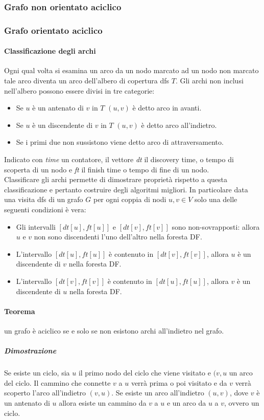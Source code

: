 \subsubsection{Grafo non orientato aciclico}



\subsubsection{Grafo orientato aciclico}
\paragraph{Classificazione degli archi}
Ogni qual volta si esamina un arco da un nodo marcato ad un nodo non marcato tale arco diventa un arco dell'albero di copertura dfs $T$. Gli archi non 
inclusi nell'albero possono essere divisi in tre categorie:
\begin{itemize}
\item Se $u$ \`e un antenato di $v$ in $T$ $(u, v)$ \`e detto arco in avanti.
\item Se $u$ \`e un discendente di $v$ in $T$ $(u, v)$ \`e detto arco all'indietro.
\item Se i primi due non sussistono viene detto arco di attraversamento. 
\end{itemize}
Indicato con \emph{time} un contatore, il vettore \emph{dt} il discovery time, o tempo di scoperta di un nodo e \emph{ft} il finish time o tempo di fine di un 
nodo.\\

Classificare gli archi permette di dimostrare propriet\`a rispetto a questa classificazione e pertanto costruire degli algoritmi migliori. In particolare 
data una visita dfs di un grafo $G$ per ogni coppia di nodi $u, v\in V$ solo una delle seguenti condizioni \`e vera:
\begin{itemize}
\item Gli intervalli $[dt[u], ft[u]]$ e $[dt[v], ft[v]]$ sono non-sovrapposti: allora $u$ e $v$ non sono discendenti l'uno dell'altro nella foresta DF.
\item L'intervallo $[dt[u], ft[u]]$ \`e contenuto in $[dt[v], ft[v]]$, allora $u$ \`e un discendente di $v$ nella foresta DF.
\item L'intervallo $[dt[v], ft[v]]$ \`e contenuto in $[dt[u], ft[u]]$, allora $v$ \`e un discendente di $u$ nella foresta DF.
\end{itemize}
\paragraph{Teorema}
un grafo \`e aciclico se e solo se non esistono archi all'indietro nel grafo.
\subparagraph{Dimostrazione}
Se esiste un ciclo, sia $u$ il primo nodo del ciclo che viene visitato e $(v, u$ un arco del ciclo. Il cammino che connette $v$ a $u$ verr\`a prima o poi
visitato e da $v$ verr\`a scoperto l'arco all'indietro $(v, u)$. Se esiste un arco all'indietro $(u, v)$, dove $v$ \`e un antenato di $u$ allora esiste
un cammino da $v$ a $u$ e un arco da $u$ a $v$, ovvero un ciclo.

